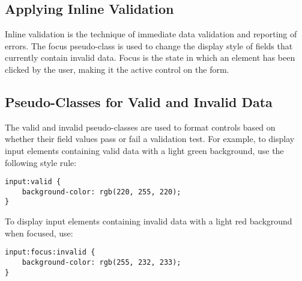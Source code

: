 \documentclass{article}
\begin{document}
\subsection{Applying Inline Validation}
Inline validation is the technique of immediate data validation and reporting of errors. The focus pseudo-class is used to change the display style of fields that currently contain invalid data. Focus is the state in which an element has been clicked by the user, making it the active control on the form.

\subsection{Pseudo-Classes for Valid and Invalid Data}
The valid and invalid pseudo-classes are used to format controls based on whether their field values pass or fail a validation test. For example, to display input elements containing valid data with a light green background, use the following style rule:
\begin{lstlisting}
input:valid {
    background-color: rgb(220, 255, 220);
}
\end{lstlisting}
To display input elements containing invalid data with a light red background when focused, use:
\begin{lstlisting}
input:focus:invalid {
    background-color: rgb(255, 232, 233);
}
\end{lstlisting}
\end{document}
